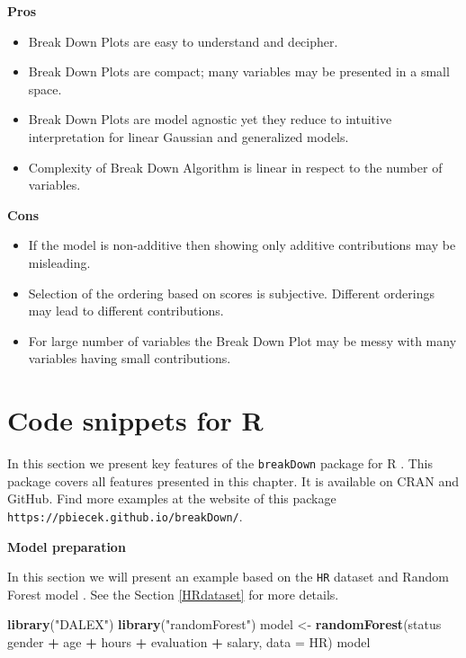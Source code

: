 \documentclass[]{book}
\newenvironment{Shaded}{\begin{snugshade}}{\end{snugshade}}
\newcommand{\DataTypeTok}[1]{\textcolor[rgb]{0.13,0.29,0.53}{#1}}
\newcommand{\KeywordTok}[1]{\textcolor[rgb]{0.13,0.29,0.53}{\textbf{#1}}}
\newcommand{\NormalTok}[1]{#1}
\newcommand{\OperatorTok}[1]{\textcolor[rgb]{0.81,0.36,0.00}{\textbf{#1}}}
\newcommand{\StringTok}[1]{\textcolor[rgb]{0.31,0.60,0.02}{#1}}
\providecommand{\tightlist}{%
  \setlength{\itemsep}{0pt}\setlength{\parskip}{0pt}}
\theoremstyle{definition}
\theoremstyle{definition}
\theoremstyle{definition}
\theoremstyle{remark}
\begin{document}
\textbf{Pros}

\begin{itemize}
\tightlist
\item
  Break Down Plots are easy to understand and decipher.
\item
  Break Down Plots are compact; many variables may be presented in a
  small space.
\item
  Break Down Plots are model agnostic yet they reduce to intuitive
  interpretation for linear Gaussian and generalized models.
\item
  Complexity of Break Down Algorithm is linear in respect to the number
  of variables.
\end{itemize}

\textbf{Cons}

\begin{itemize}
\tightlist
\item
  If the model is non-additive then showing only additive contributions
  may be misleading.
\item
  Selection of the ordering based on scores is subjective. Different
  orderings may lead to different contributions.
\item
  For large number of variables the Break Down Plot may be messy with
  many variables having small contributions.
\end{itemize}

\hypertarget{code-snippets-for-r}{%
\section{Code snippets for R}\label{code-snippets-for-r}}

In this section we present key features of the \texttt{breakDown}
package for R \citep{R-breakDown}. This package covers all features
presented in this chapter. It is available on CRAN and GitHub. Find more
examples at the website of this package
\texttt{https://pbiecek.github.io/breakDown/}.

\textbf{Model preparation}

In this section we will present an example based on the \texttt{HR}
dataset and Random Forest model \citep{R-randomForest}. See the Section
\ref{HRdataset} for more details.

\begin{Shaded}
\begin{Highlighting}[]
\KeywordTok{library}\NormalTok{(}\StringTok{"DALEX"}\NormalTok{)}
\KeywordTok{library}\NormalTok{(}\StringTok{"randomForest"}\NormalTok{)}
\NormalTok{model <-}\StringTok{ }\KeywordTok{randomForest}\NormalTok{(status }\OperatorTok{~}\StringTok{ }\NormalTok{gender }\OperatorTok{+}\StringTok{ }\NormalTok{age }\OperatorTok{+}\StringTok{ }\NormalTok{hours }\OperatorTok{+}\StringTok{ }\NormalTok{evaluation }\OperatorTok{+}\StringTok{ }\NormalTok{salary, }\DataTypeTok{data =}\NormalTok{ HR)}
\NormalTok{model}
\end{Highlighting}
\end{Shaded}
\end{document}
